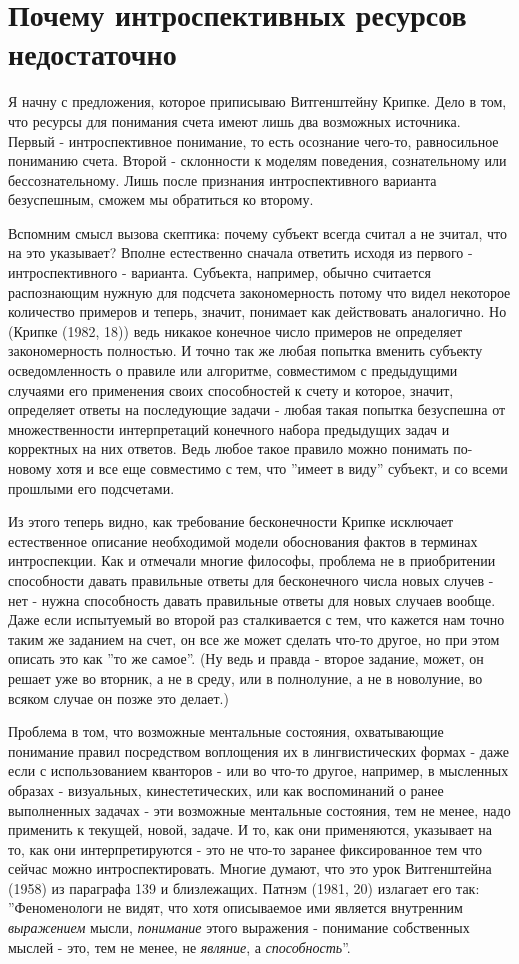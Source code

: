 \documentclass{book}
\begin{document}
\section{Почему интроспективных ресурсов недостаточно}

Я начну с предложения, которое приписываю Витгенштейну Крипке. Дело в том, что ресурсы для понимания счета имеют лишь два возможных источника. Первый - интроспективное понимание, то есть осознание чего-то, равносильное пониманию счета. Второй - склонности к моделям поведения, сознательному или бессознательному. Лишь после признания интроспективного варианта безуспешным, сможем мы обратиться ко второму.

Вспомним смысл вызова скептика: почему субъект всегда считал а не зчитал, что на это указывает? Вполне естественно сначала ответить исходя из первого - интроспективного - варианта. Субъекта, например, обычно считается распознающим нужную для подсчета закономерность потому что видел некоторое количество примеров и теперь, значит, понимает как действовать аналогично. Но (Крипке (1982, 18)) ведь никакое конечное число примеров не определяет закономерность полностью. И точно так же любая попытка вменить субъекту осведомленность о правиле или алгоритме, совместимом с предыдущими случаями его применения своих способностей к счету и которое, значит, определяет ответы на последующие задачи - любая такая попытка безуспешна от множественности интерпретаций конечного набора предыдущих задач и корректных на них ответов. Ведь любое такое правило можно понимать по-новому хотя и все еще совместимо с тем, что ''имеет в виду'' субъект, и со всеми прошлыми его подсчетами.

Из этого теперь видно, как требование бесконечности Крипке исключает естественное описание необходимой модели обоснования фактов в терминах интроспекции. Как и отмечали многие философы, проблема не в приобритении способности давать правильные ответы для бесконечного числа новых случев - нет - нужна способность давать правильные ответы для новых случаев вообще. Даже если испытуемый во второй раз сталкивается с тем, что кажется нам точно таким же заданием на счет, он все же может сделать что-то другое, но при этом описать это как ''то же самое''. (Ну ведь и правда - второе задание, может, он решает уже во вторник, а не в среду, или в полнолуние, а не в новолуние, во всяком случае он позже это делает.)

Проблема в том, что возможные ментальные состояния, охватывающие понимание правил посредством воплощения их в лингвистических формах - даже если с использованием кванторов - или во что-то другое, например, в мысленных образах - визуальных, кинестетических, или как воспоминаний о ранее выполненных задачах - эти возможные ментальные состояния, тем не менее, надо применить к текущей, новой, задаче. И то, как они применяются, указывает на то, как они интерпретируются - это не что-то заранее фиксированное тем что сейчас можно интроспектировать. Многие думают, что это урок Витгенштейна (1958) из параграфа 139 и близлежащих. Патнэм (1981, 20) излагает его так: ''Феноменологи не видят, что хотя описываемое ими является внутренним \textit{выражением} мысли, \textit{понимание} этого выражения - понимание собственных мыслей - это, тем не менее, не \textit{являние}, а \textit{способность}''.
\end{document}
